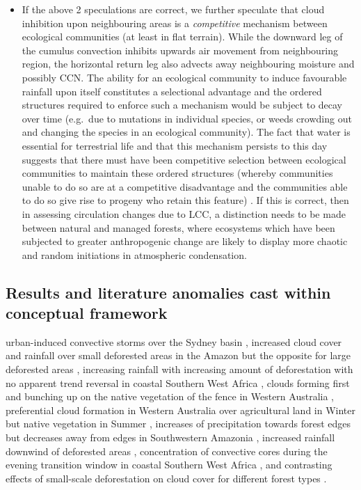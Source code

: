\begin{itemize}
	\item If the above 2 speculations are correct, we further speculate that cloud inhibition upon neighbouring areas is a \textit{competitive} mechanism between ecological communities (at least in flat terrain). While the downward leg of the cumulus convection inhibits upwards air movement from neighbouring region, the horizontal return leg also advects away neighbouring moisture and possibly \ac{CCN}. The ability for an ecological community to induce favourable rainfall upon itself constitutes a selectional advantage and the ordered structures required to enforce such a mechanism would be subject to decay over time (e.g.\ due to mutations in individual species, or weeds crowding out and changing the species in an ecological community). The fact that water is essential for terrestrial life and that this mechanism persists to this day suggests that there must have been competitive selection between ecological communities to maintain these ordered structures (whereby communities unable to do so are at a competitive disadvantage and the communities able to do so give rise to progeny who retain this feature) \citep{gorshkov2000}. If this is correct, then in assessing circulation changes due to \ac{LCC}, a distinction needs to be made between natural and managed forests, where ecosystems which have been subjected to greater anthropogenic change are likely to display more chaotic and random initiations in atmospheric condensation.
\end{itemize}

\subsection[Observations cast within framework]{Results and literature anomalies cast within conceptual framework}
\label{ssec:model_explain}

urban-induced convective storms over the Sydney basin \citep{gero2006}, increased cloud cover and rainfall over small deforested areas in the Amazon but the opposite for large deforested areas \citep{khanna2017}, increasing rainfall with increasing amount of deforestation with no apparent trend reversal in coastal Southern West Africa \citep{taylor2022}, clouds forming first and bunching up on the native vegetation of the fence in Western Australia \citep{lyons2002}, preferential cloud formation in Western Australia over agricultural land in Winter but native vegetation in Summer \citep{ray2003}, increases of precipitation towards forest edges but decreases away from edges in Southwestern Amazonia \citep{knox2011}, increased rainfall downwind of deforested areas \citep{khanna2017}, concentration of convective cores during the evening transition window in coastal Southern West Africa \citep{taylor2022}, and contrasting effects of small-scale deforestation on cloud cover for different forest types \citep{xu2022}.

